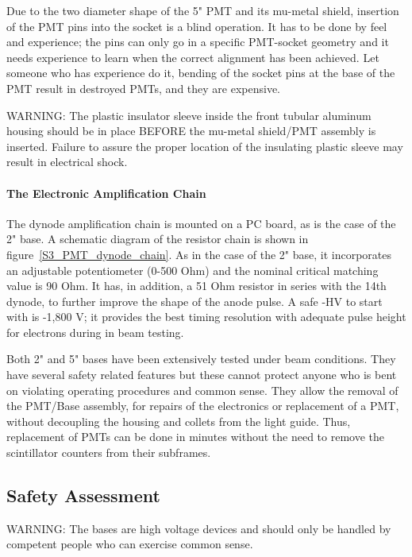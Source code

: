 \documentclass[12pt]{article}
\begin{document}
Due to the two diameter shape of the 5" PMT and its mu-metal shield, insertion  
of the PMT pins into the socket is a blind operation. It has to be done by feel 
and experience; the pins can only go in a specific PMT-socket geometry and it 
needs experience to learn when the correct alignment has been achieved. Let 
someone who has experience do it, bending of the socket pins at the base of the 
PMT result in destroyed PMTs, and they are expensive.

WARNING: The plastic insulator sleeve inside the front tubular aluminum 
housing should be in place BEFORE the mu-metal shield/PMT assembly is inserted. 
Failure to assure the proper location of the insulating plastic sleeve may 
result in electrical shock.
 
\paragraph{The Electronic Amplification Chain}


The dynode amplification chain is mounted on a PC board, as is the case of the 
2" base. A schematic diagram of the resistor chain is shown in 
figure~\ref{S3_PMT_dynode_chain}. As in 
the case of the 2" base, it incorporates an adjustable potentiometer (0-500 
Ohm) and the nominal critical matching value is 90 Ohm. It has, in addition, a 
51 Ohm resistor in series with the 14th dynode, to further improve the shape of 
the anode pulse. A safe -HV to start with is -1,800 V; it provides the best 
timing resolution with adequate pulse height for electrons during in beam 
testing.

   Both 2" and 5" bases have been extensively tested under beam conditions. 
They have several safety related features but these cannot protect anyone who 
is bent on violating operating procedures and common sense. They allow the 
removal of the PMT/Base assembly, for repairs of the electronics or replacement 
of a PMT, without decoupling the housing and collets from the light guide. 
Thus, replacement of PMTs can be done in minutes without the need to remove the 
scintillator counters from their subframes.



\subsection{Safety Assessment}

WARNING: The bases are high voltage devices and should only be handled by 
competent people who can exercise common sense.
\end{document}
